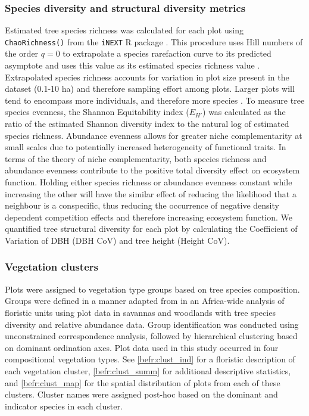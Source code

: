 \begin{refsection}
\subsubsection{Species diversity and structural diversity metrics}
\label{befr:sssec:diversity}

Estimated tree species richness was calculated for each plot using \texttt{ChaoRichness()} from the \texttt{iNEXT} R package \citep{Hsieh2016}. This procedure uses Hill numbers of the order $q=0$ to extrapolate a species rarefaction curve to its predicted asymptote and uses this value as its estimated species richness value \citep{Jost2006}. Extrapolated species richness accounts for variation in plot size present in the dataset (0.1-10 ha) and therefore sampling effort among plots. Larger plots will tend to encompass more individuals, and therefore more species \citep{Dengler2009}. To measure tree species evenness, the Shannon Equitability index ($E_{H'}$) \citep{Smith1996} was calculated as the ratio of the estimated Shannon diversity index to the natural log of estimated species richness. Abundance evenness allows for greater niche complementarity at small scales due to potentially increased heterogeneity of functional traits. In terms of the theory of niche complementarity, both species richness and abundance evenness contribute to the positive total diversity effect on ecosystem function. Holding either species richness or abundance evenness constant while increasing the other will have the similar effect of reducing the likelihood that a neighbour is a conspecific, thus reducing the occurrence of negative density dependent competition effects and therefore increasing ecosystem function. We quantified tree structural diversity for each plot by calculating the Coefficient of Variation of DBH (DBH CoV) and tree height (Height CoV). 

\subsubsection{Vegetation clusters}
\label{befr:sssec:clusters}

Plots were assigned to vegetation type groups based on tree species composition. Groups were defined in a manner adapted from \citet{Fayolle2018} in an Africa-wide analysis of floristic units using plot data in savannas and woodlands with tree species diversity and relative abundance data. Group identification was conducted using unconstrained correspondence analysis, followed by hierarchical clustering based on dominant ordination axes. Plot data used in this study occurred in four compositional vegetation types. See \autoref{befr:clust_ind} for a floristic description of each vegetation cluster, \autoref{befr:clust_summ} for additional descriptive statistics, and \autoref{befr:clust_map} for the spatial distribution of plots from each of these clusters. Cluster names were assigned post-hoc based on the dominant and indicator species in each cluster.


\end{refsection}
